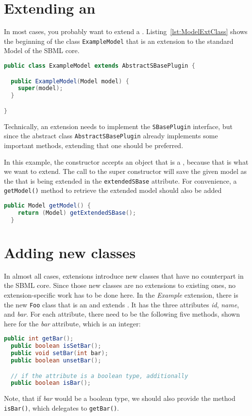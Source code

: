 \section{Extending an \SBase}
\label{subsec:extendingSBase}

In most cases, you probably want to extend a \Model.
Listing~\vref{lst:ModelExtClass} shows the beginning of the class
\texttt{ExampleModel} that is an extension to the standard Model of the SBML core.
\begin{lstlisting}[language=Java,float,caption={Extending \texttt{AbstractSBasePlugin}},label={lst:ModelExtClass}]
public class ExampleModel extends AbstractSBasePlugin {

  public ExampleModel(Model model) {
    super(model);
  }

}
\end{lstlisting}
Technically, an extension needs to implement the \texttt{SBasePlugin} interface,
but since the abstract class \texttt{AbstractSBasePlugin} already implements some important methods, extending that one should be preferred.

In this example, the constructor accepts an object that is a \Model, because that is what we want to extend.
The call to the super constructor will save the given model as the
\SBase{} that is being extended in the \texttt{extendedSBase} attribute.
For convenience, a \texttt{getModel()} method to retrieve the extended model
should also be added
\begin{lstlisting}[language=Java,float,caption={Convenience method to retrieve the extended model},label={lst:ModelExtGetModel}]
  public Model getModel() {
    return (Model) getExtendedSBase();
  }
\end{lstlisting}


\section{Adding new classes}
\label{subsec:addingClasses}

In almost all cases, extensions introduce new classes that have no counterpart
in the SBML core. Since those new classes are no extensions to existing ones,
no extension-specific work has to be done here. In the \emph{Example}
extension, there is the new \texttt{Foo} class that is an \SBase{} and extends
\AbstractNamedSBase. It has the three attributes \emph{id}, \emph{name}, and
\emph{bar}. For each attribute, there need to be the following five methods,
shown here for the \emph{bar} attribute, which is an integer:
\begin{lstlisting}[language=Java,float,caption={Five necessary methods that
should be created for each \texttt{Foo} class attribute},label={lst:ModelExtFooBar}]
  public int getBar();
  public boolean isSetBar();
  public void setBar(int bar);
  public boolean unsetBar();

  // if the attribute is a boolean type, additionally
  public boolean isBar();
\end{lstlisting}
Note, that if \emph{bar} would be a boolean type, we should also provide the method \texttt{isBar()}, which delegates to \texttt{getBar()}.

